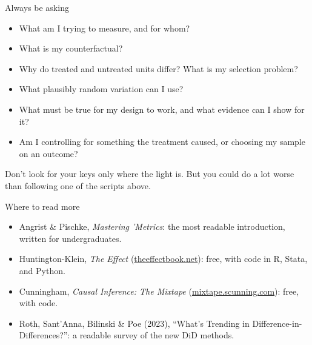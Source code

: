 \documentclass[aspectratio=169,11pt]{beamer}
\begin{document}
\begin{frame}{Always be asking}
\begin{itemize}
	\item What am I trying to \alert{measure}, and for \alert{whom}?
	\item What is my \alert{counterfactual}?
	\item Why do treated and untreated units differ? What is my \alert{selection problem}?
	\item What \alert{plausibly random} variation can I use?
	\item What must be true for my design to work, and \alert{what evidence can I show} for it?
	\item Am I controlling for something the treatment \alert{caused}, or choosing my sample on an outcome?
\end{itemize}
\medskip
Don't look for your keys only where the light is. But you could do a lot worse than following one of the scripts above.
\end{frame}


\begin{frame}{Where to read more}
\begin{itemize}
	\item Angrist \& Pischke, \alert{\emph{Mastering 'Metrics}}: the most readable introduction, written for undergraduates.
	\item Huntington-Klein, \alert{\emph{The Effect}} (\href{https://theeffectbook.net}{theeffectbook.net}): free, with code in R, Stata, and Python.
	\item Cunningham, \alert{\emph{Causal Inference: The Mixtape}} (\href{https://mixtape.scunning.com}{mixtape.scunning.com}): free, with code.
	\item Roth, Sant'Anna, Bilinski \& Poe (2023), ``What's Trending in Difference-in-Differences?'': a readable survey of the new DiD methods.
\end{itemize}
\end{frame}
\end{document}
